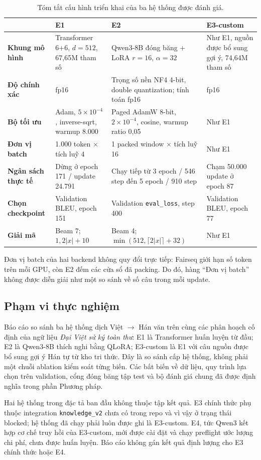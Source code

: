 \begin{table}[tbp]
  \centering
  \footnotesize
  \renewcommand{\arraystretch}{1.16}
  \setlength{\tabcolsep}{3.5pt}
  \caption{Tóm tắt cấu hình triển khai của ba hệ thống được đánh giá.}
  \label{tab:exp-recap}
  \begin{tabularx}{\textwidth}{@{}>{\bfseries}p{2.35cm}XXX@{}}
    \toprule
    & E1 & E2 & E3-custom \\
    \midrule
    Khung mô hình
      & Transformer 6+6, $d=512$, 67,65M tham số
      & Qwen3-8B đóng băng + LoRA $r=16$, $\alpha=32$
      & Như E1, nguồn được bổ sung gợi ý, 74,64M tham số \\
    Độ chính xác
      & fp16
      & Trọng số nền NF4 4-bit, double quantization; tính toán fp16
      & fp16 \\
    Bộ tối ưu
      & Adam, $5\times10^{-4}$, inverse-sqrt, warmup 8.000
      & Paged AdamW 8-bit, $2\times10^{-4}$, cosine, warmup ratio 0,05
      & Như E1 \\
    Đơn vị batch
      & 1.000 token $\times$ tích luỹ 4
      & 1 packed window $\times$ tích luỹ 16
      & Như E1 \\
    Ngân sách thực tế
      & Dừng ở epoch 171 / update 24.791
      & Chạy tiếp từ 3 epoch / 546 step đến 5 epoch / 910 step
      & Chạm 50.000 update ở epoch 87 \\
    Chọn checkpoint
      & Validation BLEU, epoch 151
      & Validation \texttt{eval\_loss}, step 400
      & Validation BLEU, epoch 77 \\
    Giải mã
      & Beam 7; $1{,}2|x|+10$
      & Beam 4; $\min(512,\lceil2|x|\rceil+32)$
      & Như E1 \\
    \bottomrule
  \end{tabularx}
\end{table}

Đơn vị batch của hai backend không quy đổi trực tiếp: Fairseq giới hạn số token
trên mỗi GPU, còn E2 đếm các cửa sổ đã packing. Do đó, hàng “Đơn vị batch”
không được diễn giải như một so sánh về số câu trong mỗi update.

\subsection{Phạm vi thực nghiệm}

Báo cáo so sánh ba hệ thống dịch Việt $\rightarrow$ Hán văn trên cùng các phân
hoạch cố định của ngữ liệu \emph{Đại Việt sử ký toàn thư}: E1 là Transformer
huấn luyện từ đầu; E2 là Qwen3-8B thích nghi bằng QLoRA; E3-custom là E1 với
câu nguồn được bổ sung gợi ý Hán tự từ kho tri thức. Đây là so sánh cấp hệ
thống, không phải một chuỗi ablation kiểm soát từng biến. Các bất biến về dữ
liệu, quy trình lựa chọn trên validation, cổng đóng băng tập test và bộ đánh
giá chung đã được định nghĩa trong phần Phương pháp.

Hai hệ thống trong đặc tả ban đầu không thuộc tập kết quả. E3 chính thức phụ
thuộc integration \texttt{knowledge\_v2} chưa có trong repo và vì vậy ở trạng
thái blocked; hệ thống đã chạy phải luôn được ghi là E3-custom. E4, tức Qwen3
kết hợp cơ chế truy hồi của E3-custom, mới được cài đặt và chạy preflight ước
lượng chi phí, chưa được huấn luyện. Báo cáo không gán kết quả định lượng cho
E3 chính thức hoặc E4.
